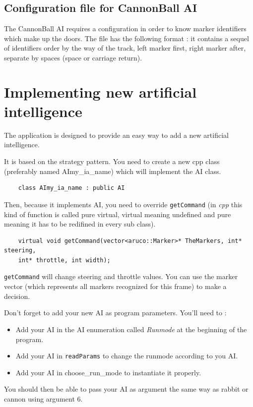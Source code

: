 \documentclass[a4paper,11pt]{report}
\begin{document}
\subsection{Configuration file for CannonBall AI}
\label{subsec:doorsfile}

The CannonBall AI requires a configuration in order to know marker identifiers
which make up the doors. The file has the following format : it contains a
sequel of identifiers order by the way of the track, left marker first, right
marker after, separate by spaces (space or carriage return).

\section{Implementing new artificial intelligence}

The application is designed to provide an easy way to add a new artificial
intelligence.

It is based on the strategy pattern. You need to create a new cpp class
(preferably named AImy\_ia\_name) which will implement the AI class.
\begin{verbatim}
    class AImy_ia_name : public AI
\end{verbatim}
Then, because it implements AI, you need to override \texttt{getCommand} (in
\emph{cpp} this kind of function is called pure virtual, virtual meaning
undefined and pure meaning it has to be redifined in every sub class).
\begin{verbatim}
	virtual void getCommand(vector<aruco::Marker>* TheMarkers, int* steering,
    int* throttle, int width);
\end{verbatim}
\texttt{getCommand} will change steering and throttle values. You can use the marker
vector (which represents all markers recognized for this frame) to make a
decision.

Don't forget to add your new AI as program parameters. You'll need to :
\begin{itemize}
    \item Add your AI in the AI enumeration called \emph{Runmode} at the beginning of the
        program.
    \item Add your AI in \texttt{readParams} to change the runmode according to you AI.
    \item Add your AI in choose\_run\_mode to instantiate it properly.
\end{itemize}
You should then be able to pass your AI as argument the same way as rabbit or
cannon using argument 6.
\end{document}
